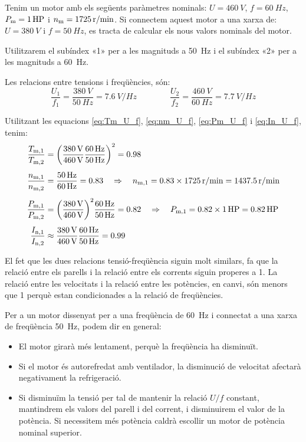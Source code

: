 \begin{exemple}[\MotorVarParamTensFreq{}]
	\addcontentsxms{\MotorVarParamTensFreq}
	Tenim un motor amb els següents paràmetres nominals: $U=\qty{460}{V}$, $f=\qty{60}{Hz}$,  $P_\mathrm{m}=\qty{1}{HP}$ i $n_\mathrm{m}=\qty{1725}{r/min}$. Si connectem aquest motor a una xarxa de: $U=\qty{380}{V}$ i $f=\qty{50}{Hz}$, es tracta de calcular els nous valors nominals del motor.
	
	Utilitzarem el subíndex «1» per a les magnituds  a \qty{50}{Hz} i el  subíndex «2» per a les magnituds a \qty{60}{Hz}.
	
	Les relacions entre tensions i freqüències,  són:
	\[
		\frac{U_1}{f_1} = \frac{\qty{380}{V}}{\qty{50}{Hz}} = \qty{7,6}{V/Hz} \qquad \qquad
		\frac{U_2}{f_2} = \frac{\qty{460}{V}}{\qty{60}{Hz}} = \qty{7,7}{V/Hz} 
	\]

	Utilitzant les equacions \eqref{eq:Tm_U_f},  \eqref{eq:nm_U_f}, \eqref{eq:Pm_U_f} i \eqref{eq:In_U_f},  tenim:
	\begin{align*}
		\frac{T_\mathrm{m,1}}{T_\mathrm{m,2}} &= {\left(\frac{\qty{380}{V}}{\qty{460}{V}}\frac{\qty{60}{Hz}}{\qty{50}{Hz}}\right)}^2 = \num{0,98} \\[1ex]
		\frac{n_\mathrm{m,1}}{n_\mathrm{m,2}} &= \frac{\qty{50}{Hz}}{\qty{60}{Hz}} = \num{0,83}  \quad \Rightarrow \quad n_\mathrm{m,1} = \num{0,83} \times \qty{1725}{r/min} = \qty{1437,5}{r/min} \\[1ex]
		\frac{P_\mathrm{m,1}}{P_\mathrm{m,2}} &= {\left(\frac{\qty{380}{V}}{\qty{460}{V}}\right)}^{2} \frac{\qty{60}{Hz}}{\qty{50}{Hz}} = \num{0,82} \quad \Rightarrow \quad P_\mathrm{m,1} = \num{0,82} \times \qty{1}{HP} = \qty{0,82}{HP}\\[1ex]
		\frac{I_\mathrm{n,1}}{I_\mathrm{n,2}} &\approx
		\frac{\qty{380}{V}}{\qty{460}{V}} \frac{\qty{60}{Hz}}{\qty{50}{Hz}} = \num{0,99}
	\end{align*}

	El fet que les dues relacions tensió-freqüència siguin molt similars, fa que la relació entre els parells i la relació entre els corrents siguin properes a 1. La relació entre les velocitats i la relació entre les potències, en canvi, són menors que 1 perquè estan condicionades a la relació de freqüències. 
\end{exemple}


Per a un motor dissenyat per a una freqüència de \qty{60}{Hz} i connectat a una xarxa de freqüència \qty{50}{Hz}, podem dir en general:
\begin{itemize}
	\item El motor girarà més lentament, perquè la freqüència ha disminuït.
	\item Si el motor és autorefredat amb ventilador, la disminució de velocitat afectarà negativament  la refrigeració.
	\item Si disminuïm la tensió  per tal de mantenir la relació $U/f$ constant, mantindrem els valors del parell i del corrent, i disminuirem el valor de la potència. Si necessitem més potència caldrà escollir un motor de potència nominal superior. 	
\end{itemize}

